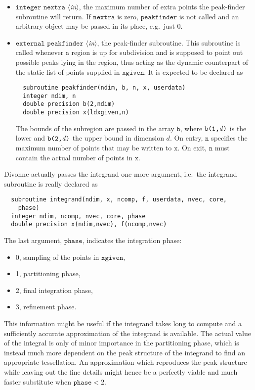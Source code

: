 \documentclass[12pt]{article}
\newcommand\ie{i.e.\ }
\newcommand\eg{e.g.\ }
\newcommand\Code[1]{\ensuremath{\texttt{#1}}}
\newcommand\Var[1]{\ensuremath{\mathit{#1}}}
\newcommand\VarIn[1]{\item\Code{#1} \textit{$\langle$in\/$\rangle$},}
\begin{document}
\begin{itemize}
\VarIn{integer nextra}
the maximum number of extra points the peak-finder subroutine will
return.  If \Code{nextra} is zero, \Code{peakfinder} is not called
and an arbitrary object may be passed in its place, \eg just 0.

\VarIn{external peakfinder}
the peak-finder subroutine.  This subroutine is called whenever a region 
is up for subdivision and is supposed to point out possible peaks lying 
in the region, thus acting as the dynamic counterpart of the static list 
of points supplied in \Code{xgiven}.  It is expected to be declared as
\begin{verbatim}
  subroutine peakfinder(ndim, b, n, x, userdata)
  integer ndim, n
  double precision b(2,ndim)
  double precision x(ldxgiven,n)
\end{verbatim}
The bounds of the subregion are passed in the array \Code{b}, where 
\Code{b(1,\Var{d})} is the lower and \Code{b(2,\Var{d})} the upper 
bound in dimension \Var{d}.  On entry, \Code{n} specifies the maximum 
number of points that may be written to \Code{x}.  On exit, \Code{n} 
must contain the actual number of points in \Code{x}.
\end{itemize}
Divonne actually passes the integrand one more argument, \ie the 
integrand subroutine is really declared as
\begin{verbatim}
  subroutine integrand(ndim, x, ncomp, f, userdata, nvec, core,
    phase)
  integer ndim, ncomp, nvec, core, phase
  double precision x(ndim,nvec), f(ncomp,nvec)
\end{verbatim}
The last argument, \Code{phase}, indicates the integration phase:
\begin{itemize}
\item 0, sampling of the points in \Code{xgiven},
\item 1, partitioning phase,
\item 2, final integration phase,
\item 3, refinement phase.
\end{itemize}
This information might be useful if the integrand takes long to compute
and a sufficiently accurate approximation of the integrand is available. 
The actual value of the integral is only of minor importance in the
partitioning phase, which is instead much more dependent on the peak
structure of the integrand to find an appropriate tessellation.  An
approximation which reproduces the peak structure while leaving out the
fine details might hence be a perfectly viable and much faster
substitute when $\Code{phase} < 2$.
\end{document}
